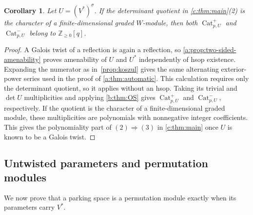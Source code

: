 \documentclass[11pt]{amsart}
\DeclareMathOperator{\Cat}{Cat}
\newtheorem{corollary}[theorem]{Corollary}
\theoremstyle{definition}
\newcommand{\Z}{\mathbb Z}\newcommand{\N}{\mathbb Z_{\ge0}}
\begin{document}
\begin{corollary}\label{cor:formal-products}
Let $U=(V^*)^\sigma$. If the determinant quotient in
\cref{c:thm:main}(2) is the character of a finite-dimensional graded
$W$-module, then both $\Cat^+_{p,U}$ and $\Cat^-_{p,U}$ belong to
$\Z_{\geq0}[q]$.
\end{corollary}
\begin{proof}
A Galois twist of a reflection is again a reflection, so
\cref{a:prop:two-sided-amenability} proves amenability of $U$ and
$U^*$ independently of hsop existence. Expanding the numerator as
in~\cref{prop:koszul} gives the same alternating exterior-power series
used in the proof of \cref{a:thm:automatic}. This calculation requires
only the determinant quotient, so it applies without an hsop.
Taking its trivial and $\det U$ multiplicities and applying
\cref{b:thm:OS} gives $\Cat^+_{p,U}$ and $\Cat^-_{p,U}$, respectively.
If the quotient is the character of a finite-dimensional graded module,
these multiplicities are polynomials with nonnegative integer
coefficients. This gives the polynomiality part of $(2)\Rightarrow(3)$
in \cref{c:thm:main} once $U$ is known to be a Galois twist.
\end{proof}

\subsection{Untwisted parameters and permutation modules}\label{sec:permutation}

We now prove that a parking space is a permutation module exactly
when its parameters carry $V^*$. %
\end{document}
